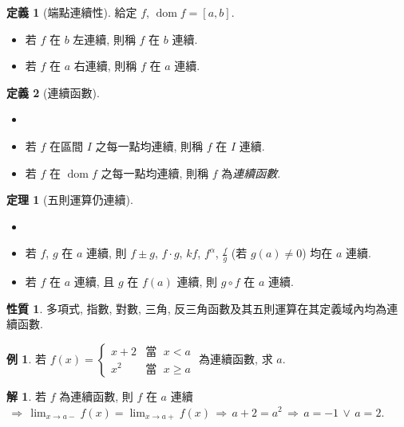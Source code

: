 \documentclass[12pt]{extarticle}
\newcommand{\ds}{\displaystyle}
\newcommand{\ie}{\,\Longrightarrow\,}
\DeclareMathOperator*{\dom}{dom}
\theoremstyle{definition}
\newtheorem*{dfn}{定義}
\newtheorem*{prp}{性質}
\newtheorem*{thm}{定理}
\newtheorem*{ex}{例}
\newtheorem*{sol}{解}
\begin{document}
\begin{dfn}[端點連續性]
  給定 $f$, $\dom f = [a, b]$.  
  \begin{multicols}{2}
    \begin{itemize}\setlength\itemsep{0em}
      \item 若 $f$ 在 $b$ 左連續, 則稱 $f$ 在 $b$ 連續.  
      \item 若 $f$ 在 $a$ 右連續, 則稱 $f$ 在 $a$ 連續.  
    \end{itemize}
  \end{multicols}
\end{dfn}

\begin{dfn}[連續函數] 
  \begin{itemize}\setlength\itemsep{0em}
    \item[]
    \item 若 $f$ 在區間 $I$ 之每一點均連續, 則稱 $f$ 在 $I$ 連續.  
    \item 若 $f$ 在 $\dom f$ 之每一點均連續, 則稱 $f$ 為\emph{連續函數}.  
  \end{itemize}
\end{dfn}

\begin{thm}[五則運算仍連續]
  \begin{itemize}\setlength\itemsep{0em}
    \item[] 
    \item 若 $f$, $g$ 在 $a$ 連續, 則 $f\pm g$, $f\cdot g$, $k f$, $f^\alpha$, $\ds\frac{f}{g}$ (若 $g(a)\ne 0$) 均在 $a$ 連續. 
    \item 若 $f$ 在 $a$ 連續, 且 $g$ 在 $f(a)$ 連續, 則 $g\circ f$ 在 $a$ 連續. 
  \end{itemize}
\end{thm}

\begin{prp}
  多項式, 指數, 對數, 三角, 反三角函數及其五則運算在其定義域內均為連續函數. 
\end{prp}

\begin{ex}
  若 $\ds f(x) = \begin{cases}x + 2 & \text{當 }\; x < a \\ x^2 & \text{當 }\; x\geqslant a\end{cases}$ 為連續函數, 求 $a$. 
\end{ex}

\begin{sol}
  若 $f$ 為連續函數, 則 $f$ 在 $a$ 連續 $\ds\ie \lim_{x\to a-}f(x) = \lim_{x\to a+} f(x) \ie a + 2 = a^2 \ie a = -1\,\vee\, a = 2$. 
\end{sol}
\end{document}
